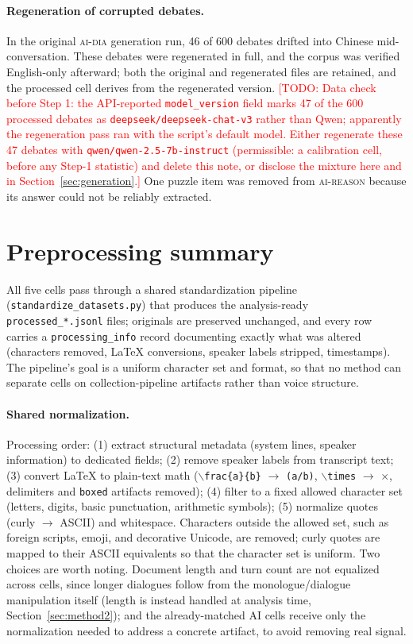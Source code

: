 \documentclass[11pt]{article}
\newcommand{\todo}[1]{\textcolor{red}{[TODO: #1]}}
\newcommand{\cellad}{\textsc{ai-dia}}
\newcommand{\cellrt}{\textsc{ai-reason}}
\begin{document}
\paragraph{Regeneration of corrupted debates.} In the original \cellad{}
generation run, 46 of 600 debates drifted into Chinese mid-conversation. These
debates were regenerated in full, and the corpus was verified English-only
afterward; both the original and regenerated files are retained, and the
processed cell derives from the regenerated version. \todo{Data check before
Step 1: the API-reported \texttt{model\_version} field marks 47 of the 600
processed debates as \texttt{deepseek/deepseek-chat-v3} rather than
Qwen; apparently the regeneration pass ran with the script's default model.
Either regenerate these 47 debates with \texttt{qwen/qwen-2.5-7b-instruct}
(permissible: a calibration cell, before any Step-1 statistic) and delete this
note, or disclose the mixture here and in Section~\ref{sec:generation}.} One
puzzle item was removed from \cellrt{} because its answer could not be
reliably extracted.

\section{Preprocessing summary}
\label{app:preprocessing}

All five cells pass through a shared standardization pipeline
(\texttt{standardize\_datasets.py}) that produces the analysis-ready
\texttt{processed\_*.jsonl} files; originals are preserved unchanged, and
every row carries a \texttt{processing\_info} record documenting exactly
what was altered (characters removed, LaTeX conversions, speaker labels
stripped, timestamps). The pipeline's goal is a uniform character set and
format, so that no method can separate cells on collection-pipeline
artifacts rather than voice structure.

\paragraph{Shared normalization.} Processing order: (1) extract structural
metadata (system lines, speaker information) to dedicated fields; (2) remove
speaker labels from transcript text; (3) convert LaTeX to plain-text math
($\backslash$\texttt{frac\{a\}\{b\}} $\to$ \texttt{(a/b)},
$\backslash$\texttt{times} $\to$ $\times$, delimiters and \texttt{boxed}
artifacts removed); (4) filter to a fixed allowed character set (letters,
digits, basic punctuation, arithmetic symbols); (5) normalize quotes (curly
$\to$ ASCII) and whitespace. Characters outside the allowed set, such as
foreign scripts, emoji, and decorative Unicode, are removed; curly quotes are mapped to
their ASCII equivalents so that the character set is uniform. Two choices are
worth noting. Document length and turn count are not equalized across cells,
since longer dialogues follow from the monologue/dialogue manipulation itself
(length is instead handled at analysis time, Section~\ref{sec:method2}); and
the already-matched AI cells receive only the normalization needed to address a
concrete artifact, to avoid removing real signal.
\end{document}
